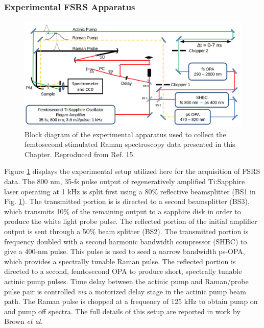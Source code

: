 \subsubsection{Experimental FSRS Apparatus}

\begin{figure}
\begin{center}
\includegraphics[width=\textwidth]{./Chapter2/fsrs_setup.png}
\caption[Block diagram of femtosecond stimulated Raman spectroscopy apparatus.]{Block diagram of the experimental apparatus \cite{doi:10.1021/jz301107c} used to collect the femtosecond stimulated Raman spectroscopy data presented in this Chapter.  Reproduced from Ref. 15.}
\label{f:fsrssetup}
\end{center}
\end{figure}

Figure \ref{f:fsrssetup} displays the experimental setup utilized here for the acquisition of FSRS data. The 800 nm, 35-fs pulse output of regeneratively amplified Ti:Sapphire laser operating at 1 kHz is split first using a 80\% reflective beamsplitter (BS1 in Fig. \ref{f:fsrssetup}). The transmitted portion is is directed to a second beamsplitter (BS3), which transmits 10\% of the remaining output to a sapphire disk in order to produce the white light probe pulse. The reflected portion of the initial amplifier output is sent through a 50\% beam splitter (BS2). The transmitted portion is frequency doubled with a second harmonic bandwidth compressor (SHBC) to give a 400-nm pulse. This pulse is used to seed a narrow bandwidth ps-OPA, which provides a spectrally tunable Raman pulse. The reflected portion is directed to a second, femtosecond OPA to produce short, spectrally tunable actinic pump pulses. Time delay between the actinic pump and Raman/probe pulse pair is controlled \emph{via} a motorized delay stage in the actinic pump beam path. The Raman pulse is chopped at a frequency of 125 kHz to obtain pump on and pump off spectra. The full details of this setup are reported in work by Brown \emph{et al.} \cite{doi:10.1021/jz301107c}

